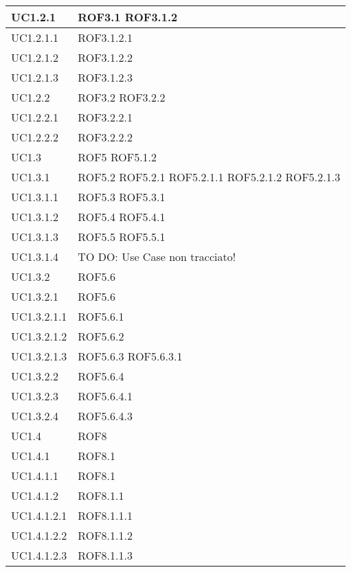 \begin{center}
\begin{longtable}{| p{4cm} | p{4cm} |}
\hline
UC1.2.1 & ROF3.1 \newline ROF3.1.2 \\
\hline
UC1.2.1.1 & ROF3.1.2.1 \\
\hline
UC1.2.1.2 & ROF3.1.2.2 \\
\hline
UC1.2.1.3 & ROF3.1.2.3 \\
\hline
UC1.2.2 & ROF3.2 \newline ROF3.2.2 \\
\hline
UC1.2.2.1 & ROF3.2.2.1 \\
\hline
UC1.2.2.2 & ROF3.2.2.2 \\
\hline
UC1.3 & ROF5 \newline ROF5.1.2 \\
\hline
UC1.3.1 & ROF5.2 \newline ROF5.2.1 \newline ROF5.2.1.1 \newline ROF5.2.1.2 \newline ROF5.2.1.3 \\
\hline
UC1.3.1.1 & ROF5.3 \newline ROF5.3.1 \\
\hline
UC1.3.1.2 & ROF5.4 \newline ROF5.4.1 \\
\hline
UC1.3.1.3 & ROF5.5 \newline ROF5.5.1 \\
\hline
UC1.3.1.4 & TO DO: Use Case non tracciato! \\
\hline
UC1.3.2 & ROF5.6 \\
\hline
UC1.3.2.1 & ROF5.6 \\
\hline
UC1.3.2.1.1 & ROF5.6.1 \\
\hline
UC1.3.2.1.2 & ROF5.6.2 \\
\hline
UC1.3.2.1.3 & ROF5.6.3 \newline ROF5.6.3.1 \\
\hline
UC1.3.2.2 & ROF5.6.4 \\
\hline
UC1.3.2.3 & ROF5.6.4.1 \\
\hline
UC1.3.2.4 & ROF5.6.4.3 \\
\hline
UC1.4 & ROF8 \\
\hline
UC1.4.1 & ROF8.1 \\
\hline
UC1.4.1.1 & ROF8.1 \\
\hline
UC1.4.1.2 & ROF8.1.1 \\
\hline
UC1.4.1.2.1 & ROF8.1.1.1 \\
\hline
UC1.4.1.2.2 & ROF8.1.1.2 \\
\hline
UC1.4.1.2.3 & ROF8.1.1.3 \\

\end{longtable}
\end{center}
